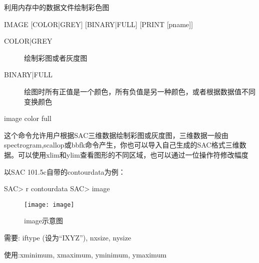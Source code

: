 \label{cmd:image}

利用内存中的数据文件绘制彩色图

\begin{SACSTX}
IMAGE [COLOR|GREY] [BINARY|FULL] [PRINT [pname]]
\end{SACSTX}

\begin{description}
\item [COLOR|GREY] 绘制彩图或者灰度图
\item [BINARY|FULL] 绘图时所有正值是一个颜色，所有负值是另一种颜色，或者根据数据值不同变换颜色 
\end{description}

\begin{SACDFT}
image color full
\end{SACDFT}

这个命令允许用户根据SAC三维数据绘制彩图或灰度图，三维数据一般由spectrogram,scallop或bbfk命令产生，你也可以导入自己生成的SAC格式三维数据。可以使用xlim和ylim查看图形的不同区域，也可以通过一位操作符修改幅度

以SAC 101.5c自带的contourdata为例：
\begin{SACCode}
SAC> r contourdata
SAC> image
\end{SACCode}

\begin{figure}[!ht]
\centering
\texttt{[image: image]}
\caption{image示意图}
\end{figure}

需要: iftype (设为``IXYZ''), nxsize, nysize

使用:xminimum, xmaximum, yminimum, ymaximum
